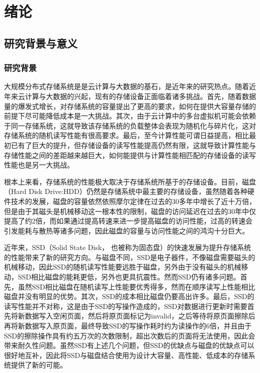 
\chapter{绪论}
\label{chap:intro}

\section{研究背景与意义}

\subsection{研究背景}
\label{sec:backgrounds}

大规模分布式存储系统是是云计算与大数据的基石，是近年来的研究热点。随着近年来云计算与大数据的兴起，现有的存储设备正面临着诸多挑战。首先，随着数据量的爆发式增长，对存储系统的容量提出了更高的要求，如何在提供大容量存储的前提下尽可能降低成本是一大挑战\cite{gray2003next}。其次，由于云计算中的多台虚拟机可能会依赖于同一存储系统，这就导致该存储系统的负载整体会表现为随机化与碎片化，这对存储系统的随机读写性能有很高要求。最后，至今计算性能可谓日益提高，相比最初已有了巨大的提升，但存储设备的读写性能提高仍然有限，这就导致计算性能与存储性能之间的差距越来越巨大\cite{morris2003evolution}，如何能提供与计算性能相匹配的存储设备的读写性能也是另一大挑战。

根本上来看，存储系统的性能极大取决于存储系统所基于的存储设备。目前，磁盘（Hard Disk Drive:HDD）仍然是存储系统中最主要的存储设备，虽然随着各种硬件技术的发展，磁盘的容量依然依照摩尔定律\cite{schirle1996history}在过去的30多年中增长了近十万倍，但是由于其磁头是机械移动这一根本性的限制，磁盘的访问延迟在过去的30年中仅提高了约2倍，而如果通过提高转速来进一步提高磁盘的访问性能，过高的转速会引发能耗与散热等诸多问题，因此磁盘的容量与访问性能之间的鸿沟十分巨大。

近年来，SSD（Solid State Disk， 也被称为固态盘）的快速发展为提升存储系统的性能带来了新的研究方向。与磁盘不同，SSD是电子器件，不像磁盘需要磁头的机械移动，因此SSD的随机读写性能要远胜于磁盘，另外由于没有磁头的机械移动，SSD相比磁盘的能耗更低，另外也更具抗震性。然而SSD仍有诸多问题。首先，虽然SSD相比磁盘在随机读写上性能要优秀得多，然而在顺序读写上性能相比磁盘并没有明显的优势。其次，SSD的成本相比磁盘仍要高出许多。最后，SSD的读写性能并不对称，这是由于SSD的写操作造成的，SSD对数据进行更新时需要首先将新数据写入空闲页面，然后将原页面标记为invalid，之后等待将原页面擦除后再将新数据写入原页面，最终导致SSD的写操作耗时约为读操作的6倍，并且由于SSD的擦除操作具有约五万次的次数限制，超出次数后的页面将无法使用，因此会带来耐久性问题。虽然SSD有上述几个问题，但SSD的优缺点与磁盘的优缺点可以很好地互补，因此将SSD与磁盘结合使用为设计大容量、高性能、低成本的存储系统提供了新的可能。


